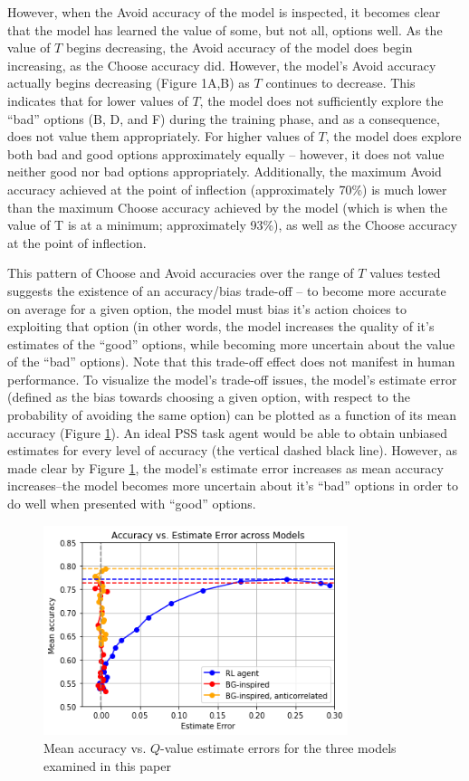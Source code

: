 \documentclass[10pt,letterpaper]{article}
\begin{document}
However, when the Avoid accuracy of the model is inspected, it becomes clear that the model has learned the value of some, but not all, options well. As the value of $T$ begins decreasing, the Avoid accuracy of the model does begin increasing, as the Choose accuracy did. However, the model's Avoid accuracy actually begins decreasing (Figure 1A,B) as $T$ continues to decrease. This indicates that for lower values of $T$, the model does not sufficiently explore the ``bad'' options (B, D, and F) during the training phase, and as a consequence, does not value them appropriately. For higher values of $T$, the model does explore both bad and good options approximately equally -- however, it does not value neither good nor bad options appropriately. Additionally, the maximum Avoid accuracy achieved at the point of inflection (approximately 70\%) is much lower than the maximum Choose accuracy achieved by the model (which is when the value of T is at a minimum; approximately 93\%), as well as the Choose accuracy at the point of inflection. 

This pattern of Choose and Avoid accuracies over the range of $T$ values tested suggests the existence of an accuracy/bias trade-off -- to become more accurate on average for a given option, the model must bias it's action choices to exploiting that option (in other words, the model increases the quality of it's estimates of the ``good'' options, while becoming more uncertain about the value of the ``bad'' options). Note that this trade-off effect does not manifest in human performance. To visualize the model's trade-off issues, the model's estimate error (defined as the bias towards choosing a given option, with respect to the probability of avoiding the same option) can be plotted as a function of its mean accuracy (Figure \ref{roc}). An ideal PSS task agent would be able to obtain unbiased estimates for every level of accuracy (the vertical dashed black line). However, as made clear by Figure \ref{roc}, the model's estimate error increases as mean accuracy increases--the model becomes more uncertain about it’s ``bad'' options in order to do well when presented with ``good'' options.

\begin{figure}[ht]
	\begin{center}
		\includegraphics[width=3.5in]{roc-agents.png}
	\end{center}
	\caption{Mean accuracy vs. $Q$-value estimate errors for the three models examined in this paper} 
	\label{roc}
\end{figure}
\end{document}

